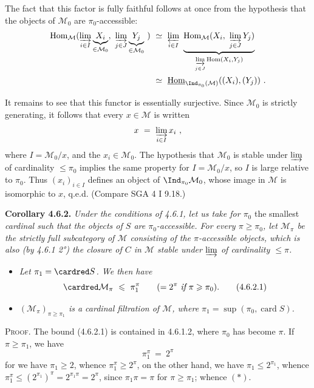 The fact that this factor is fully faithful follows at once from the hypothesis that the objects of $\mathcal{M}_0$ are $\pi_0$-accessible: %
\[
\begin{aligned}
\operatorname{Hom}_{\mathcal{M}}(\varinjlim_{i\in I}\underbrace{X_i}_{\in\mathcal{M}_0},\ \varinjlim_{j\in J}\underbrace{Y_j}_{\in\mathcal{M}_0}\ ) &\ \simeq\ \varprojlim_{i\in I}\ \underbrace{\operatorname{Hom}_{\mathcal{M}}(X_i,\ \varinjlim_{j\in J}Y_j)}_{\varinjlim\limits_{j\in J}\operatorname{Hom}(X_i,Y_j)}\\
&\ \simeq\ \underline{\operatorname{Hom}}_{\Ind_{\pi_0}(\mathcal{M})}((X_i),(Y_j))\ .
\end{aligned}
\]


It remains to see that this functor is essentially surjective. Since $\mathcal{M}_0$ is strictly generating, it follows that every $x\in\mathcal{M}$ is written
\[
x \ =\ \varinjlim_{i\in I}x_i\ ,
\]
where $I=\mathcal{M}_0/x$, and the $x_i\in\mathcal{M}_0$. The hypothesis that $\mathcal{M}_0$ is stable under $\varinjlim$ of cardinality $\leqslant\pi_0$ implies the same property for $I=\mathcal{M}_0/x$, so $I$ is large relative to $\pi_0$. Thus $(x_i)_{i\in I}$ defines an object of $\Ind_{\pi_0}\mathcal{M}_0$, whose image in $\mathcal{M}$ is isomorphic to $x$, q.e.d. (Compare SGA 4 I 9.18.)

\textbf{Corollary 4.6.2.} \textit{Under the conditions of 4.6.1, let us take for $\pi_0$} the smallest \textit{cardinal such that the objects of $S$ are $\pi_0$-accessible. For every $\pi\geqslant\pi_0$, let $\mathcal{M}_\pi$ be the strictly full subcategory of $\mathcal{M}$ consisting of the $\pi$-accessible objects, which is also (by 4.6.1 2°) the closure of $C$ in $\mathcal{M}$ stable under $\varinjlim$ of cardinality $\leqslant\pi$.}
\begin{itemize}[leftmargin=2.5em]
\item[\textit{1°)}] \textit{Let $\pi_1=\cardred S$. We then have}
\[
\cardred\mathcal{M}_\pi \ \leqslant\ \pi_1^{\pi} \qquad (=2^{\pi}\ \textit{if}\ \pi\geqslant\pi_0). \tag*{(4.6.2.1)}
\]
\item[\textit{2°)}] \textit{$(\mathcal{M}_\pi)_{\pi\geqslant\pi_1}$ is a cardinal filtration of $\mathcal{M}$, where $\pi_1=\sup(\pi_0,\operatorname{card}S)$.}
\end{itemize}

\textsc{Proof}. The bound (4.6.2.1) is contained in 4.6.1.2, where $\pi_0$ has become $\pi$. If $\pi\geqslant\pi_1$, we have
\[
\pi_1^{\pi} \ =\ 2^{\pi} \tag*{$(*)$}
\]
for we have $\pi_1\geqslant2$, whence $\pi_1^{\pi}\geqslant2^{\pi}$, on the other hand, we have $\pi_1\leqslant2^{\pi_1}$, whence $\pi_1^{\pi}\leqslant(2^{\pi_1})^{\pi}=2^{\pi_1\pi}=2^{\pi}$, since $\pi_1\pi=\pi$ for $\pi\geqslant\pi_1$; whence $(*)$.

